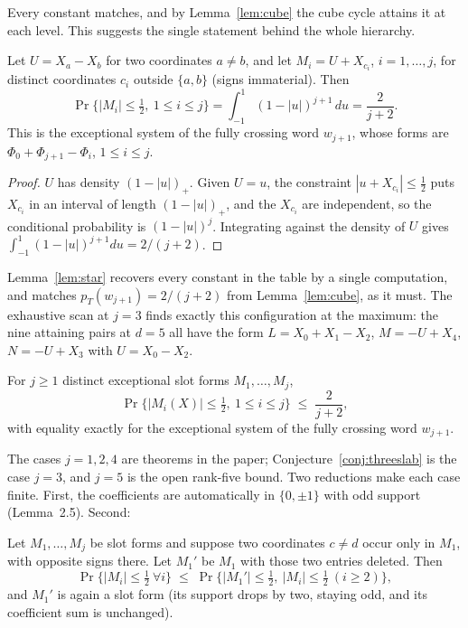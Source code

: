 Every constant matches, and by Lemma~\ref{lem:cube} the cube cycle
attains it at each level.  This suggests the single statement behind the
whole hierarchy.

\begin{lemma}\label{lem:star}
Let $U=X_a-X_b$ for two coordinates $a\ne b$, and let
$M_i=U+X_{c_i}$, $i=1,\dots,j$, for distinct coordinates $c_i$ outside
$\{a,b\}$ (signs immaterial).  Then
\[
\Pr\bigl\{|M_i|\le\tfrac12,\ 1\le i\le j\bigr\}
=\int_{-1}^{1}(1-|u|)^{j+1}\,du=\frac{2}{j+2}.
\]
This is the exceptional system of the fully crossing word $w_{j+1}$,
whose forms are $\Phi_0+\Phi_{j+1}-\Phi_i$, $1\le i\le j$.
\end{lemma}

\begin{proof}
$U$ has density $(1-|u|)_+$.  Given $U=u$, the constraint $|u+X_{c_i}|\le
\tfrac12$ puts $X_{c_i}$ in an interval of length $(1-|u|)_+$, and the
$X_{c_i}$ are independent, so the conditional probability is
$(1-|u|)^j$.  Integrating against the density of $U$ gives
$\int_{-1}^1(1-|u|)^{j+1}du=2/(j+2)$.
\end{proof}

Lemma~\ref{lem:star} recovers every constant in the table by a single
computation, and matches $p_T(w_{j+1})=2/(j+2)$ from
Lemma~\ref{lem:cube}, as it must.  The exhaustive scan at $j=3$ finds
exactly this configuration at the maximum: the nine attaining pairs at
$d=5$ all have the form $L=X_0+X_1-X_2$, $M=-U+X_4$, $N=-U+X_3$ with
$U=X_0-X_2$.

\begin{conjecture}\label{conj:slabhier}
For $j\ge1$ distinct exceptional slot forms $M_1,\dots,M_j$,
\[
\Pr\bigl\{|M_i(X)|\le\tfrac12,\ 1\le i\le j\bigr\}\;\le\;\frac{2}{j+2},
\]
with equality exactly for the exceptional system of the fully crossing
word $w_{j+1}$.
\end{conjecture}

The cases $j=1,2,4$ are theorems in the paper; Conjecture~\ref{conj:threeslab}
is the case $j=3$, and $j=5$ is the open rank-five bound.  Two reductions
make each case finite.  First, the coefficients are automatically in
$\{0,\pm1\}$ with odd support (Lemma~2.5).  Second:

\begin{lemma}\label{lem:anderson}
Let $M_1,\dots,M_j$ be slot forms and suppose two coordinates $c\ne d$
occur only in $M_1$, with opposite signs there.  Let $M_1'$ be $M_1$ with
those two entries deleted.  Then
\[
\Pr\bigl\{|M_i|\le\tfrac12\ \forall i\bigr\}\;\le\;
\Pr\bigl\{|M_1'|\le\tfrac12,\ |M_i|\le\tfrac12\ (i\ge2)\bigr\},
\]
and $M_1'$ is again a slot form (its support drops by two, staying odd,
and its coefficient sum is unchanged).
\end{lemma}

